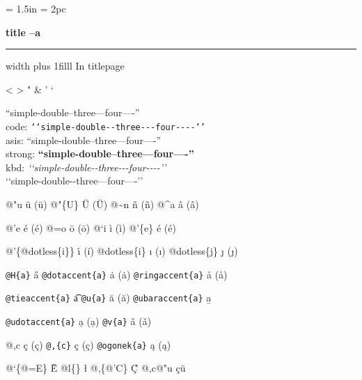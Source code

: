 \documentclass{book}
\newcommand\Texinfocommandstyletextkbd[1]{{\ttfamily\textsl{#1}}}%
\renewcommand{\_}{\Texinfounderscore\discretionary{}{}{}}
\begin{document}
\frontmatter
\pagestyle{empty}%
\begin{titlepage}
\begingroup
\newskip\titlepagetopglue \titlepagetopglue = 1.5in
\newskip\titlepagebottomglue \titlepagebottomglue = 2pc
\setlength{\parindent}{0pt}
    \vglue\titlepagetopglue
{\raggedright {\huge \bfseries title --a}}
\vskip 4pt \hrule height 4pt width \hsize \vskip 4pt
\vskip 0pt plus 1filll
%
%
In titlepage

<
>
"
\&
'
`

``simple-double--three---four----''\leavevmode{}\\
code: \texttt{{`}{`}simple-double{-}{-}three{-}{-}{-}four{-}{-}{-}-{'}{'}} \leavevmode{}\\
asis: ``simple-double--three---four----'' \leavevmode{}\\
strong: \textbf{``simple-double--three---four----''} \leavevmode{}\\
kbd: \Texinfocommandstyletextkbd{{`}{`}simple-double{-}{-}three{-}{-}{-}four{-}{-}{-}-{'}{'}} \leavevmode{}\\

`\hbox{}`simple-double-\hbox{}-three---four----'\hbox{}'\leavevmode{}\\

%
%
%
%

@"u \"{u} (ü)
@"\{U\} \"{U} (Ü) 
@\~{}n \~{n} (ñ)
@\^{}a \^{a} (â)

@'e \'{e} (é)
@=o \={o} (ō)
@`i \`{i} (ì)
@'\{e\} \'{e} (é)

@'\{@dotless\{i\}\} \'{\i{}} (í)
@dotless\{i\} \i{} (ı)
@dotless\{j\} \j{} (ȷ)

\texttt{@H\{a\}} \H{a}
\texttt{@dotaccent\{a\}} \.{a} (ȧ)
\texttt{@ringaccent\{a\}} \r{a} (å)

\texttt{@tieaccent\{a\}} \t{a}
\texttt{@u\{a\}} \u{a} (ă)
\texttt{@ubaraccent\{a\}} \b{a}

\texttt{@udotaccent\{a\}} \d{a} (ạ)
\texttt{@v\{a\}} \v{a} (ǎ)

@,c \c{c} (ç)
\texttt{@,\{c\}} \c{c} (ç)
\texttt{@ogonek\{a\}} \k{a} (ą)

@`\{@=E\} \`{\={E}}
@l\{\} \l{}
@,\{@'C\} \c{\'{C}}
@,c@"u \c{c}\"{u} \leavevmode{}\\


\end{titlepage}
\end{document}
